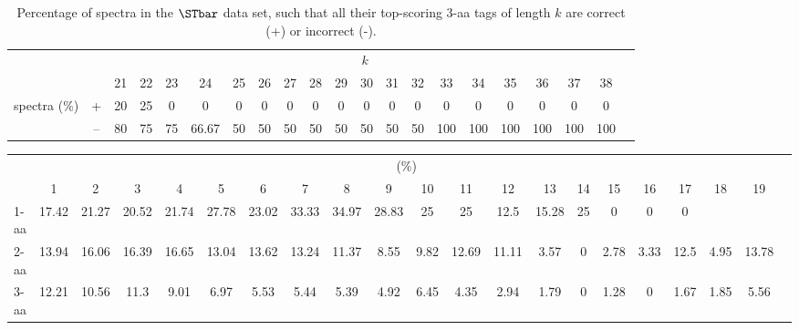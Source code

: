 \begin{table}[ht]\footnotesize
\vspace{3mm}
{\centering
\begin{center}
\begin{tabular}{|c|c|c|c|c|c|c|c|c|c|c|c|c|c|c|c|c|c|c|c|c|}
  \hline
  \multicolumn{2}{|c|}{ } & \multicolumn{ 18}{|c|}{$k$} \\
  \cline{3-20 }
  \multicolumn{2}{|c|}{ } 
 & 21 & 22 & 23 & 24 & 25 & 26 & 27 & 28 & 29 & 30 & 31 & 32 & 33 & 34 & 35 & 36 & 37 & 38\\
  \hline
  \multirow{2}{*}{spectra (\%)} & +  & 20 & 25 & 0 & 0 & 0 & 0 & 0 & 0 & 0 & 0 & 0 & 0 & 0 & 0 & 0 & 0 & 0 & 0 \\
      & --  & 80 & 75 & 75 & 66.67 & 50 & 50 & 50 & 50 & 50 & 50 & 50 & 50 & 100 & 100 & 100 & 100 & 100 & 100 \\
  \hline
\end{tabular}
\end{center}
\par}
\centering

\caption{Percentage of spectra in the $\STbar$ data set, such that all their top-scoring 3-aa tags of length $k$ are correct (+) or incorrect (-).}

\vspace{3mm}
\label{table:all-top-scoring}
\end{table}
\begin{table}[h]\tiny
\vspace{3mm}
{\centering
\begin{center}
\begin{tabular}{|l|c|c|c|c|c|c|c|c|c|c|c|c|c|c|c|c|c|c|c|c|}
  \hline
  & \multicolumn{ 19 }{|c|}{(\%)} \\
  \cline{2- 20}
    & 1 & 2 & 3 & 4 & 5 & 6 & 7 & 8 & 9 & 10 & 11 & 12 & 13 & 14 & 15 & 16 & 17 & 18 & 19\\
  \hline
1-aa  & 17.42 & 21.27 & 20.52 & 21.74 & 27.78 & 23.02 & 33.33 & 34.97 & 28.83 & 25 & 25 & 12.5 & 15.28 & 25 & 0 & 0 & 0 &  & \\
2-aa  & 13.94 & 16.06 & 16.39 & 16.65 & 13.04 & 13.62 & 13.24 & 11.37 & 8.55 & 9.82 & 12.69 & 11.11 & 3.57 & 0 & 2.78 & 3.33 & 12.5 & 4.95 & 13.78\\
3-aa  & 12.21 & 10.56 & 11.3 & 9.01 & 6.97 & 5.53 & 5.44 & 5.39 & 4.92 & 6.45 & 4.35 & 2.94 & 1.79 & 0 & 1.28 & 0 & 1.67 & 1.85 & 5.56\\
 \hline
\end{tabular}
\end{center}
\par}
\centering

\vspace{3mm}
\label{table:k}
\end{table}
